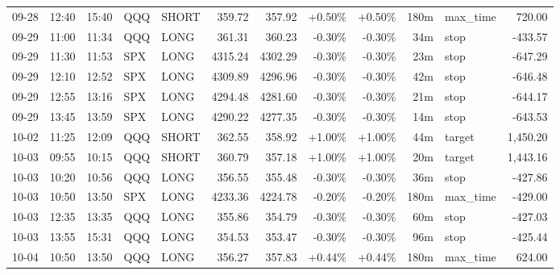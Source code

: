 \documentclass[11pt,a4paper,twoside]{article}
\begin{document}
\begin{center}
\begin{longtable}{>{\color{txtmain}}l l l l l r r r r r >{\color{txtmain}}l r}
09-28 & 12:40 & 15:40 & QQQ & SHORT & 359.72 & 357.92 & \textcolor{wingreen}{+0.50\%} & \textcolor{wingreen}{+0.50\%} & 180m & max\_time & \textcolor{wingreen}{720.00} \\
09-29 & 11:00 & 11:34 & QQQ & LONG & 361.31 & 360.23 & \textcolor{lossred}{-0.30\%} & \textcolor{lossred}{-0.30\%} & 34m & stop & \textcolor{lossred}{-433.57} \\
09-29 & 11:30 & 11:53 & SPX & LONG & 4315.24 & 4302.29 & \textcolor{lossred}{-0.30\%} & \textcolor{lossred}{-0.30\%} & 23m & stop & \textcolor{lossred}{-647.29} \\
09-29 & 12:10 & 12:52 & SPX & LONG & 4309.89 & 4296.96 & \textcolor{lossred}{-0.30\%} & \textcolor{lossred}{-0.30\%} & 42m & stop & \textcolor{lossred}{-646.48} \\
09-29 & 12:55 & 13:16 & SPX & LONG & 4294.48 & 4281.60 & \textcolor{lossred}{-0.30\%} & \textcolor{lossred}{-0.30\%} & 21m & stop & \textcolor{lossred}{-644.17} \\
09-29 & 13:45 & 13:59 & SPX & LONG & 4290.22 & 4277.35 & \textcolor{lossred}{-0.30\%} & \textcolor{lossred}{-0.30\%} & 14m & stop & \textcolor{lossred}{-643.53} \\
10-02 & 11:25 & 12:09 & QQQ & SHORT & 362.55 & 358.92 & \textcolor{wingreen}{+1.00\%} & \textcolor{wingreen}{+1.00\%} & 44m & target & \textcolor{wingreen}{1,450.20} \\
10-03 & 09:55 & 10:15 & QQQ & SHORT & 360.79 & 357.18 & \textcolor{wingreen}{+1.00\%} & \textcolor{wingreen}{+1.00\%} & 20m & target & \textcolor{wingreen}{1,443.16} \\
10-03 & 10:20 & 10:56 & QQQ & LONG & 356.55 & 355.48 & \textcolor{lossred}{-0.30\%} & \textcolor{lossred}{-0.30\%} & 36m & stop & \textcolor{lossred}{-427.86} \\
10-03 & 10:50 & 13:50 & SPX & LONG & 4233.36 & 4224.78 & \textcolor{lossred}{-0.20\%} & \textcolor{lossred}{-0.20\%} & 180m & max\_time & \textcolor{lossred}{-429.00} \\
10-03 & 12:35 & 13:35 & QQQ & LONG & 355.86 & 354.79 & \textcolor{lossred}{-0.30\%} & \textcolor{lossred}{-0.30\%} & 60m & stop & \textcolor{lossred}{-427.03} \\
10-03 & 13:55 & 15:31 & QQQ & LONG & 354.53 & 353.47 & \textcolor{lossred}{-0.30\%} & \textcolor{lossred}{-0.30\%} & 96m & stop & \textcolor{lossred}{-425.44} \\
10-04 & 10:50 & 13:50 & QQQ & LONG & 356.27 & 357.83 & \textcolor{wingreen}{+0.44\%} & \textcolor{wingreen}{+0.44\%} & 180m & max\_time & \textcolor{wingreen}{624.00} \\

\end{longtable}
\end{center}
\end{document}
